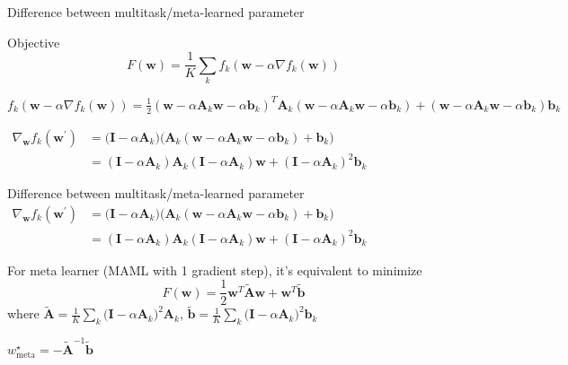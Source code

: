 \documentclass{beamer}
\begin{document}
\begin{frame}[t]{Difference between multitask/meta-learned parameter}
  \begin{block}{Objective}
  \begin{equation*}
    F(\mathbf{w}) =  \frac{1}{K} \sum_k f_k(\mathbf{w} - \alpha \nabla f_k(\mathbf{w})) 
  \end{equation*}
  \end{block}

    $f_k(\mathbf{w} - \alpha \nabla f_k (\mathbf{w})) = \frac{1}{2}(\mathbf{w} - \alpha \mathbf{A}_k \mathbf{w} - \alpha \mathbf{b}_k)^T \mathbf{A}_k (\mathbf{w} - \alpha \mathbf{A}_k \mathbf{w} - \alpha \mathbf{b}_k) + (\mathbf{w} - \alpha \mathbf{A}_k \mathbf{w} - \alpha \mathbf{b}_k) \mathbf{b}_k$
    \vspace{1em}

    $\begin{aligned}
      \nabla_\mathbf{w} f_k(\mathbf{w}^\prime) & = \big( \mathbf{I} - \alpha \mathbf{A}_k \big) \big(\mathbf{A}_k (\mathbf{w} - \alpha \mathbf{A}_k \mathbf{w}-\alpha \mathbf{b}_k) + \mathbf{b}_k \big) \\
                                               & = ( \mathbf{I} - \alpha \mathbf{A}_k ) \mathbf{A}_k ( \mathbf{I} - \alpha \mathbf{A}_k ) \mathbf{w} + (\mathbf{I} - \alpha \mathbf{A}_k)^2 \mathbf{b}_k
    \end{aligned}$
\end{frame}

\begin{frame}[t]{Difference between multitask/meta-learned parameter}
    $\begin{aligned}
      \nabla_\mathbf{w} f_k(\mathbf{w}^\prime) & = \big( \mathbf{I} - \alpha \mathbf{A}_k \big) \big(\mathbf{A}_k (\mathbf{w} - \alpha \mathbf{A}_k \mathbf{w}-\alpha \mathbf{b}_k) + \mathbf{b}_k \big) \\
                                               & = ( \mathbf{I} - \alpha \mathbf{A}_k ) \mathbf{A}_k ( \mathbf{I} - \alpha \mathbf{A}_k ) \mathbf{w} + (\mathbf{I} - \alpha \mathbf{A}_k)^2 \mathbf{b}_k
    \end{aligned}$

    \vspace{1em}

  For meta learner (MAML with 1 gradient step), it's equivalent to minimize
  \begin{equation*}
    F(\mathbf{w}) =  \frac{1}{2} \mathbf{w}^T \tilde{\mathbf{A}} \mathbf{w} + \mathbf{w}^T \tilde{\mathbf{b}}
  \end{equation*}
  where $\tilde{\mathbf{A}} = \frac{1}{K}\sum_k \big( \mathbf{I} - \alpha \mathbf{A}_k \big)^2 \mathbf{A}_k$, $\tilde{\mathbf{b}} = \frac{1}{K}\sum_k \big( \mathbf{I} - \alpha \mathbf{A}_k \big)^2\mathbf{b}_k$

  \center $\boxed{w^\star_{\text{meta}} = - \tilde{\mathbf{A}}^{-1}\tilde{\mathbf{b}}}$
\end{frame}
\label{lc}
\end{document}
